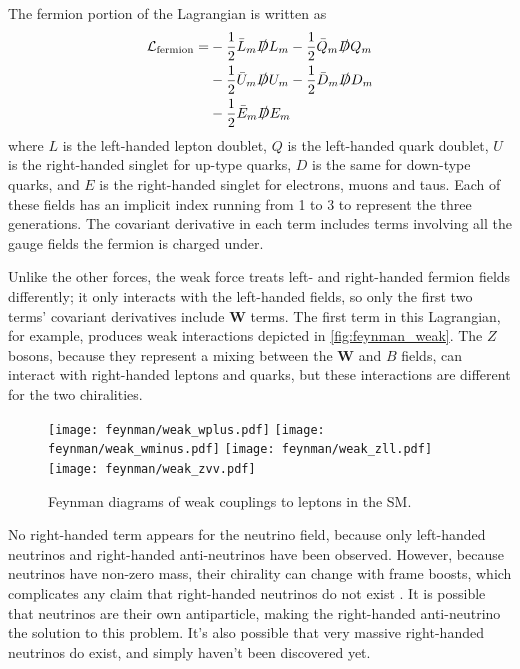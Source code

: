 The fermion portion of the Lagrangian is written as
%
\begin{equation}
\begin{split}
\mathcal{L}_\text{fermion} = & -\frac{1}{2}\bar{L}_m\slashed{D}L_m -\frac{1}{2}\bar{Q}_m\slashed{D}Q_m \\
						& -\frac{1}{2}\bar{U}_m\slashed{D}U_m -\frac{1}{2}\bar{D}_m\slashed{D}D_m \\
						& -\frac{1}{2}\bar{E}_m\slashed{D}E_m \\
\end{split}
\end{equation}
%
where $L$ is the left-handed lepton doublet, $Q$ is the left-handed quark doublet, $U$ is the right-handed singlet for up-type quarks, $D$ is the same for down-type quarks, and $E$ is the right-handed singlet for electrons, muons and taus. Each of these fields has an implicit index running from 1 to 3 to represent the three generations. The covariant derivative in each term includes terms involving all the gauge fields the fermion is charged under. 

Unlike the other forces, the weak force treats left- and right-handed fermion fields differently; it only interacts with the left-handed fields, so only the first two terms' covariant derivatives include $\bm{W}$ terms. The first term in this Lagrangian, for example, produces weak interactions depicted in \autoref{fig:feynman_weak}. The $Z$ bosons, because they represent a mixing between the $\bm{W}$ and $B$ fields, can interact with right-handed leptons and quarks, but these interactions are different for the two chiralities. 

\begin{centering}
\begin{figure}[!hbt]
\myfloatalign
\texttt{[image: feynman/weak\_wplus.pdf]}
\texttt{[image: feynman/weak\_wminus.pdf]}
\texttt{[image: feynman/weak\_zll.pdf]}
\texttt{[image: feynman/weak\_zvv.pdf]}
\caption{Feynman diagrams of weak couplings to leptons in the \ac{SM}.}
\label{fig:feynman_weak}
\end{figure}
\end{centering}

No right-handed term appears for the neutrino field, because only left-handed neutrinos and right-handed anti-neutrinos have been observed. However, because neutrinos have non-zero mass, their chirality can change with frame boosts, which complicates any claim that right-handed neutrinos do not exist \cite{Burgess:2007zi}. It is possible that neutrinos are their own antiparticle, making the right-handed anti-neutrino the solution to this problem. It's also possible that very massive right-handed neutrinos do exist, and simply haven't been discovered yet. 

